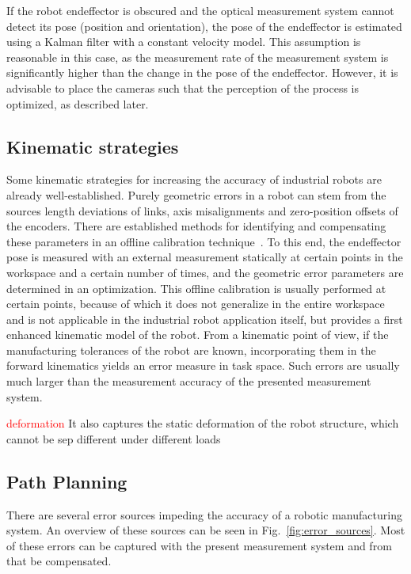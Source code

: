 \documentclass[5p,times,procedia]{elsarticle}
\begin{document}
If the robot endeffector is obscured and the optical measurement system cannot detect its pose (position and orientation), the pose of the endeffector is estimated using a Kalman filter with a constant velocity model. This assumption is reasonable in this case, as the measurement rate of the measurement system is significantly higher than the change in the pose of the endeffector.
However, it is advisable to place the cameras such that the perception of the process is optimized, as described later.


\subsection{Kinematic strategies}
Some kinematic strategies for increasing the accuracy of industrial robots are already well-established.
Purely geometric errors in a robot can stem from the sources length deviations of links, axis misalignments and zero-position offsets of the encoders.
There are established methods for identifying and compensating these parameters in an offline calibration technique~\cite{Wiest01}.
To this end, the endeffector pose is measured with an external measurement statically at certain points in the workspace and a certain number of times, and the geometric error parameters are determined in an optimization.
This offline calibration is usually performed at certain points, because of which it does not generalize in the entire workspace and is not applicable in the industrial robot application itself, but provides a first enhanced kinematic model of the robot.
From a kinematic point of view, if the manufacturing tolerances of the robot are known, incorporating them in the forward kinematics yields an error measure in task space. Such errors are usually much larger than the measurement accuracy of the presented measurement system.

\textcolor{red}{deformation}
It also captures the static deformation of the robot structure, which cannot be sep
different under different loads 

\subsection{Path Planning}\label{subsec:PathPlanning}
There are several error sources impeding the accuracy of a robotic manufacturing system.
An overview of these sources can be seen in Fig.~\ref{fig:error_sources}.
Most of these errors can be captured with the present measurement system and from that be compensated.
\end{document}
